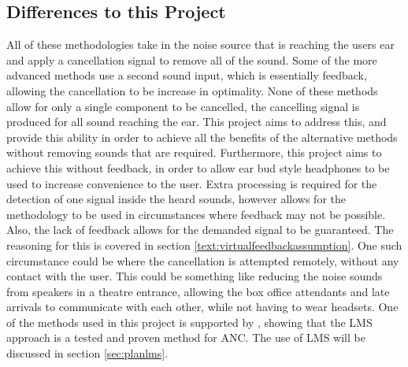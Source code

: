 \subsection{Differences to this Project}
All of these methodologies take in the noise source that is reaching the users ear and apply a cancellation signal to remove all of the sound.
Some of the more advanced methods use a second sound input, which is essentially feedback, allowing the cancellation to be increase in optimality.
None of these methods allow for only a single component to be cancelled, the cancelling signal is produced for all sound reaching the ear.
This project aims to address this, and provide this ability in order to achieve all the benefits of the alternative methods without removing sounds that are required.
Furthermore, this project aims to achieve this without feedback, in order to allow ear bud style headphones to be used to increase convenience to the user.
Extra processing is required for the detection of one signal inside the heard sounds, however allows for the methodology to be used in circumstances where feedback may not be possible.
Also, the lack of feedback allows for the demanded signal to be guaranteed.
The reasoning for this is covered in section \ref{text:virtualfeedbackassumption}.
One such circumstance could be where the cancellation is attempted remotely, without any contact with the user.
This could be something like reducing the noise sounds from speakers in a theatre entrance, allowing the box office attendants and late arrivals to communicate with each other, while not having to wear headsets.
One of the methods used in this project is supported by \cite{EMHeadsets,EMNoiseCancel,2SensorANCAlg}, showing that the LMS approach is a tested and proven method for ANC.
The use of LMS will be discussed in section \ref{sec:planlms}.
